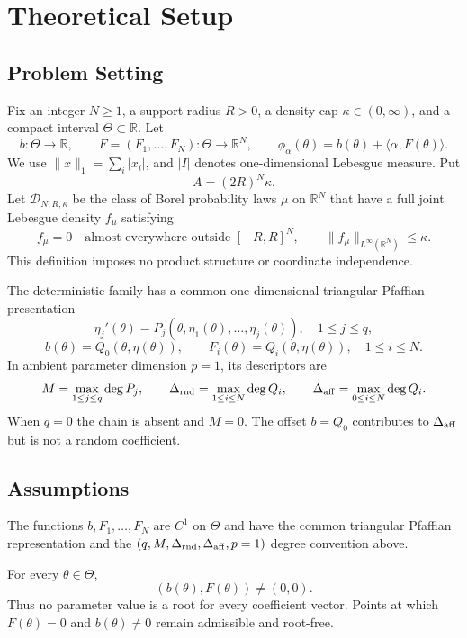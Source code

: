 \section{Theoretical Setup}

\subsection{Problem Setting}

Fix an integer $N\geq 1$, a support radius $R>0$, a density cap
$\kappa\in(0,\infty)$, and a compact interval $\Theta\subset\mathbb R$.
Let
\[
b:\Theta\to\mathbb R,
\qquad
F=(F_1,\ldots,F_N):\Theta\to\mathbb R^N,
\qquad
\phi_\alpha(\theta)=b(\theta)+\langle\alpha,F(\theta)\rangle.
\]
We use $\|x\|_1=\sum_i|x_i|$, and $|I|$ denotes one-dimensional
Lebesgue measure.  Put
\[
A=(2R)^N\kappa.
\]
Let $\mathcal D_{N,R,\kappa}$ be the class of Borel probability laws $\mu$
on $\mathbb R^N$ that have a full joint Lebesgue density $f_\mu$ satisfying
\[
f_\mu=0\quad\text{almost everywhere outside }[-R,R]^N,
\qquad
\|f_\mu\|_{L^\infty(\mathbb R^N)}\leq\kappa.
\]
This definition imposes no product structure or coordinate independence.

The deterministic family has a common one-dimensional triangular Pfaffian
presentation
\[
\eta_j'(\theta)=P_j(\theta,\eta_1(\theta),\ldots,\eta_j(\theta)),
\quad 1\leq j\leq q,
\]
\[
b(\theta)=Q_0(\theta,\eta(\theta)),
\qquad
F_i(\theta)=Q_i(\theta,\eta(\theta)),\quad 1\leq i\leq N.
\]
In ambient parameter dimension $p=1$, its descriptors are
\[
M=\max_{1\leq j\leq q}\deg P_j,
\qquad
\Delta_{\rm rnd}=\max_{1\leq i\leq N}\deg Q_i,
\qquad
\Delta_{\rm aff}=\max_{0\leq i\leq N}\deg Q_i.
\]
When $q=0$ the chain is absent and $M=0$.  The offset $b=Q_0$ contributes
to $\Delta_{\rm aff}$ but is not a random coefficient.

\subsection{Assumptions}

\begin{assumption}
\label{assump:shared-pfaffian-chain}
The functions $b,F_1,\ldots,F_N$ are $C^1$ on $\Theta$ and have the common
triangular Pfaffian representation and the
$(q,M,\Delta_{\rm rnd},\Delta_{\rm aff},p=1)$ degree convention above.
\end{assumption}

\begin{assumption}
\label{assump:no-forced-root}
For every $\theta\in\Theta$,
\[
(b(\theta),F(\theta))\neq(0,0).
\]
Thus no parameter value is a root for every coefficient vector.  Points at
which $F(\theta)=0$ and $b(\theta)\neq0$ remain admissible and root-free.
\end{assumption}

